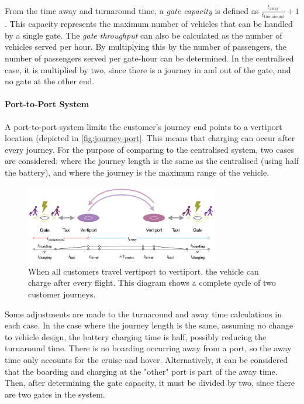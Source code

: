 From the time away and turnaround time, a \textit{gate capacity} is defined as $\frac{t_\text{away}}{t_\text{turnaround}} + 1$. This capacity represents the maximum number of vehicles that can be handled by a single gate. The \textit{gate throughput} can also be calculated as the number of vehicles served per hour. By multiplying this by the number of passengers, the number of passengers served per gate-hour can be determined. In the centralised case, it is multiplied by two, since there is a journey in and out of the gate, and no gate at the other end.

\paragraph{Port-to-Port System}
A port-to-port system limits the customer's journey end points to a vertiport location (depicted in \autoref{fig:journey-port}. This means that charging can occur after every journey. For the purpose of comparing to the centralised system, two cases are considered: where the journey length is the same as the centralised (using half the battery), and where the journey is the maximum range of the vehicle.

\begin{figure}[h]
    \centering
    \includegraphics[width=0.75\textwidth]{Figures/journey-port-port.png}
    \captionsetup{justification=centering}
    \caption{When all customers travel vertiport to vertiport, the vehicle can charge after every flight. This diagram shows a complete cycle of two customer journeys.}
    \label{fig:journey-port}
\end{figure}

Some adjustments are made to the turnaround and away time calculations in each case. In the case where the journey length is the same, assuming no change to vehicle design, the battery charging time is half, possibly reducing the turnaround time. There is no boarding occurring away from a port, so the away time only accounts for the cruise and hover. Alternatively, it can be considered that the boarding and charging at the "other" port is part of the away time. Then, after determining the gate capacity, it must be divided by two, since there are two gates in the system.

